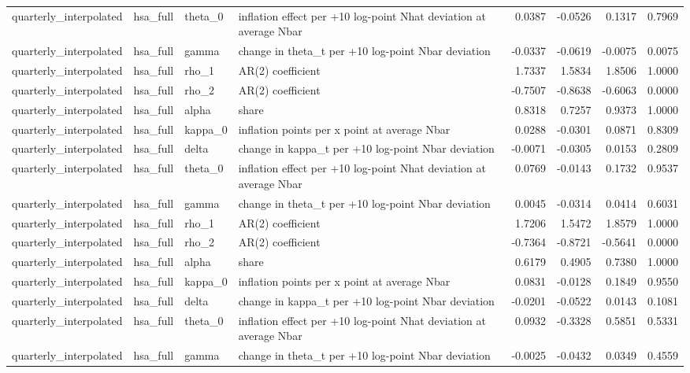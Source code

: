 \begin{tabular}{llllrrrr}
quarterly\_interpolated & hsa\_full & theta\_0 & inflation effect per +10 log-point Nhat deviation at average Nbar & 0.0387 & -0.0526 & 0.1317 & 0.7969 \\
quarterly\_interpolated & hsa\_full & gamma & change in theta\_t per +10 log-point Nbar deviation & -0.0337 & -0.0619 & -0.0075 & 0.0075 \\
quarterly\_interpolated & hsa\_full & rho\_1 & AR(2) coefficient & 1.7337 & 1.5834 & 1.8506 & 1.0000 \\
quarterly\_interpolated & hsa\_full & rho\_2 & AR(2) coefficient & -0.7507 & -0.8638 & -0.6063 & 0.0000 \\
quarterly\_interpolated & hsa\_full & alpha & share & 0.8318 & 0.7257 & 0.9373 & 1.0000 \\
quarterly\_interpolated & hsa\_full & kappa\_0 & inflation points per x point at average Nbar & 0.0288 & -0.0301 & 0.0871 & 0.8309 \\
quarterly\_interpolated & hsa\_full & delta & change in kappa\_t per +10 log-point Nbar deviation & -0.0071 & -0.0305 & 0.0153 & 0.2809 \\
quarterly\_interpolated & hsa\_full & theta\_0 & inflation effect per +10 log-point Nhat deviation at average Nbar & 0.0769 & -0.0143 & 0.1732 & 0.9537 \\
quarterly\_interpolated & hsa\_full & gamma & change in theta\_t per +10 log-point Nbar deviation & 0.0045 & -0.0314 & 0.0414 & 0.6031 \\
quarterly\_interpolated & hsa\_full & rho\_1 & AR(2) coefficient & 1.7206 & 1.5472 & 1.8579 & 1.0000 \\
quarterly\_interpolated & hsa\_full & rho\_2 & AR(2) coefficient & -0.7364 & -0.8721 & -0.5641 & 0.0000 \\
quarterly\_interpolated & hsa\_full & alpha & share & 0.6179 & 0.4905 & 0.7380 & 1.0000 \\
quarterly\_interpolated & hsa\_full & kappa\_0 & inflation points per x point at average Nbar & 0.0831 & -0.0128 & 0.1849 & 0.9550 \\
quarterly\_interpolated & hsa\_full & delta & change in kappa\_t per +10 log-point Nbar deviation & -0.0201 & -0.0522 & 0.0143 & 0.1081 \\
quarterly\_interpolated & hsa\_full & theta\_0 & inflation effect per +10 log-point Nhat deviation at average Nbar & 0.0932 & -0.3328 & 0.5851 & 0.5331 \\
quarterly\_interpolated & hsa\_full & gamma & change in theta\_t per +10 log-point Nbar deviation & -0.0025 & -0.0432 & 0.0349 & 0.4559 \\

\end{tabular}
